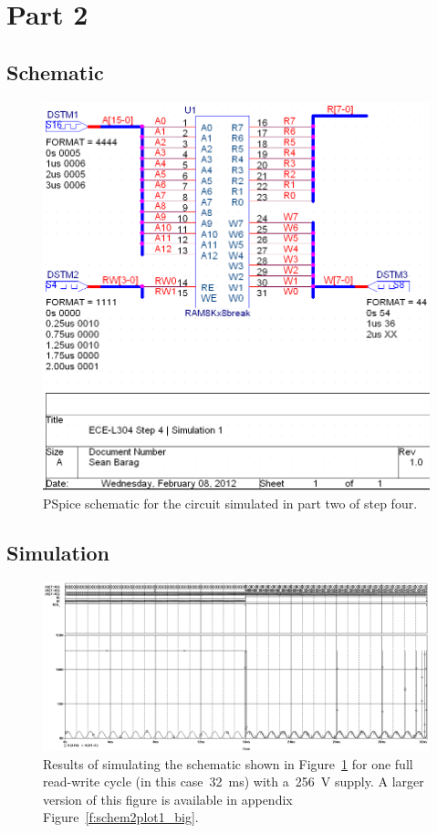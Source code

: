 \section{Part 2}

\subsection{Schematic}
\begin{figure}[H]
\centering
	\includegraphics[width=.8\textwidth]{img/shot/schem1.png}
	\parbox{.8\textwidth}{
	\caption[Part 2 Schematic]{PSpice schematic for the circuit simulated in
	part two of step four.}
	\label{f:schem2}}
\end{figure}

\subsection{Simulation}
\begin{figure}[H]
\centering
	\includegraphics[width=.8\textwidth]{img/shot/sim2_plot1.png}
	\parbox{.8\textwidth}{
	\caption[Part 2 Simulation Results 1]{Results of simulating the schematic
	shown in Figure~\ref{f:schem2} for one full read-write cycle (in this
	case~\SI{32}{\milli\second}) with a~\SI{256}{\volt} supply.  A larger
	version of this figure is available in appendix
	Figure~\ref{f:schem2plot1_big}.}
	\label{f:schem2plot1}}
\end{figure}

